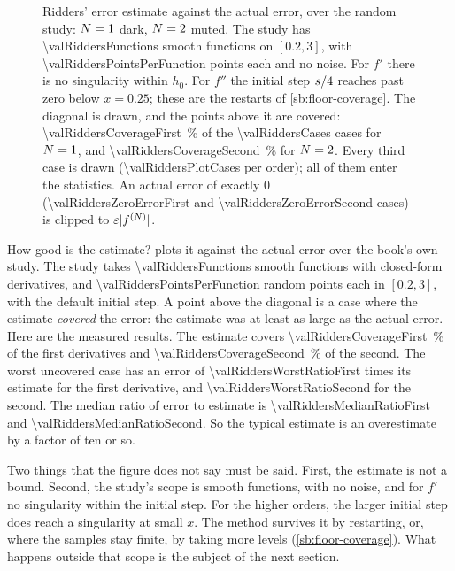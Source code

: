 \begin{figure}
\centering

\caption{Ridders' error estimate against the actual error, over the random study: $N = 1$ dark,
$N = 2$ muted. The study has \num{\valRiddersFunctions} smooth functions on $[0.2, 3]$, with
\num{\valRiddersPointsPerFunction} points each and no noise. For $f'$ there is no singularity within $h_0$. For $f''$
the initial step $s / 4$ reaches past zero below $x = 0.25$; these are the restarts of \cref{sb:floor-coverage}.
The diagonal is drawn, and the points above it are covered: \SI{\valRiddersCoverageFirst}{\percent} of the
\num{\valRiddersCases} cases for $N = 1$, and \SI{\valRiddersCoverageSecond}{\percent} for $N = 2$. Every
third case is drawn (\num{\valRiddersPlotCases} per order); all of them enter the statistics. An actual error of
exactly 0 (\num{\valRiddersZeroErrorFirst} and \num{\valRiddersZeroErrorSecond} cases) is clipped to
$\varepsilon \lvert f^{(N)} \rvert$.\label{fig:ridders-coverage}}
\end{figure}

How good is the estimate?  plots it against the actual error over the book's own study.
The study takes \num{\valRiddersFunctions} smooth functions with closed-form derivatives, and
\num{\valRiddersPointsPerFunction} random points each in $[0.2, 3]$, with the default initial step. A point above the
diagonal is a case where the estimate \emph{covered} the error: the estimate was at least as large as the actual
error. Here are the measured results. The estimate covers \SI{\valRiddersCoverageFirst}{\percent} of the first
derivatives and \SI{\valRiddersCoverageSecond}{\percent} of the second. The worst uncovered case has an error of
\num{\valRiddersWorstRatioFirst} times its estimate for the first derivative, and \num{\valRiddersWorstRatioSecond}
for the second. The median ratio of error to estimate is \num{\valRiddersMedianRatioFirst} and
\num{\valRiddersMedianRatioSecond}. So the typical estimate is an overestimate by a factor of ten or so.

Two things that the figure does not say must be said. First, the estimate is not a bound. Second, the study's scope
is smooth functions, with no noise, and for $f'$ no singularity within the initial step. For the higher orders, the
larger initial step does reach a singularity at small $x$. The method survives it by restarting, or, where the
samples stay finite, by taking more levels (\cref{sb:floor-coverage}). What happens outside that scope is the subject
of the next section.

